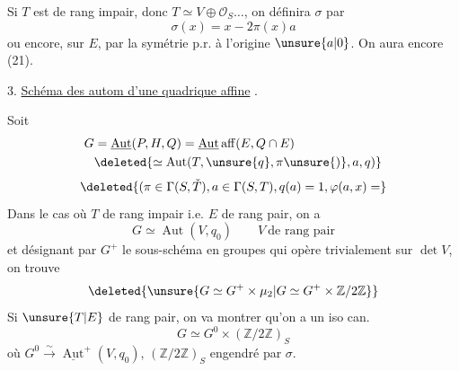 Si $T$ est de rang impair, donc $T\simeq V\oplus\mathcal O_S\ldots$, on définira  $\sigma$ par
\[
\sigma(x)=x-2\pi(x)a\tag*{(22)}
\]
ou encore, sur $E$, par la symétrie p.r. à l'origine $\unsure{a|0}$. On aura encore (21).

3. \uline{Schéma des autom d'une quadrique affine} .

Soit
\[
\begin{aligned}
G&=\underline{\operatorname{Aut}}(P,H,Q)=\underline{\operatorname{Aut}}\,\mathrm{aff}(E,Q\cap E)\\
&\deleted{\simeq\operatorname{Aut}(T,\unsure{q},\pi\unsure{)},a,q)}
\end{aligned}
\]
\[
\deleted{(\pi\in\Gamma(S,\check T),a\in\Gamma(S,T),q(a)=1,\varphi(a,x)=}
\]
Dans le cas où $T$ de rang impair i.e. $E$ de rang pair, on a
\[
G\simeq\operatorname{Aut}(V,q_0)\qquad V\ \text{de rang pair}
\]
et désignant par $G^+$ le sous-schéma en groupes qui opère trivialement sur $\det V$, on trouve
\[
\deleted{\unsure{G\simeq G^+\times\mu_2|G\simeq G^+\times\mathbb Z/2\mathbb Z}}
\]
Si $\unsure{T|E}$ de rang pair,  on va montrer qu'on a un iso can.
\[
G\simeq G^0\times(\mathbb Z/2\mathbb Z)_S
\]
où $G^0\xrightarrow{\sim}\underline{\operatorname{Aut}}^+(V,q_0)$, $(\mathbb Z/2\mathbb Z)_S$ engendré par $\sigma$.
